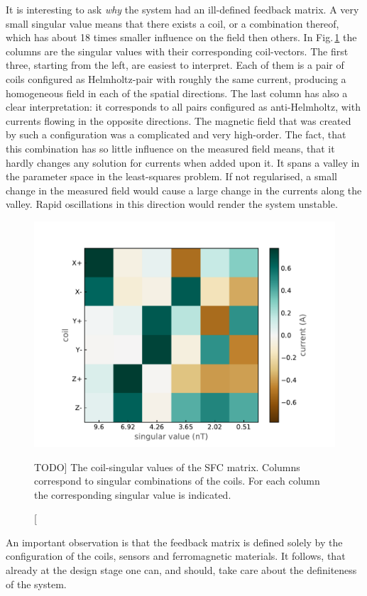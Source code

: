 It is interesting to ask \emph{why} the system had an ill-defined feedback matrix. A very small singular value means that there exists a coil, or a combination thereof, which has about 18 times smaller influence on the field then others. In Fig.\,\ref{fig:nEDM_SFC_svd} the columns are the singular values with their corresponding coil-vectors. The first three, starting from the left, are easiest to interpret. Each of them is a pair of coils configured as Helmholtz-pair with roughly the same current, producing a homogeneous field in each of the spatial directions.
The last column has also a clear interpretation: it corresponds to all pairs configured as anti-Helmholtz, with currents flowing in the opposite directions. The magnetic field that was created by such a configuration was a complicated and very high-order. The fact, that this combination has so little influence on the measured field means, that it hardly changes any solution for currents when added upon it. It spans a valley in the parameter space in the least-squares problem. If not regularised, a small change in the measured field would cause a large change in the currents along the valley. Rapid oscillations in this direction would render the system unstable.

\begin{figure}
  \centering
  \includegraphics[width=.7\linewidth]{gfx/nEDM_SFC/coil-singular_vectors_of_the_nEDM_SFC_matrix}
  \caption
  [TODO]
  {The coil-singular values of the SFC matrix. Columns correspond to singular combinations of the coils. For each column the corresponding singular value is indicated.}
  \label{fig:nEDM_SFC_svd}
\end{figure}

An important observation is that the feedback matrix is defined solely by the configuration of the coils, sensors and ferromagnetic materials. It follows, that already at the design stage one can, and should, take care about the definiteness of the system.

